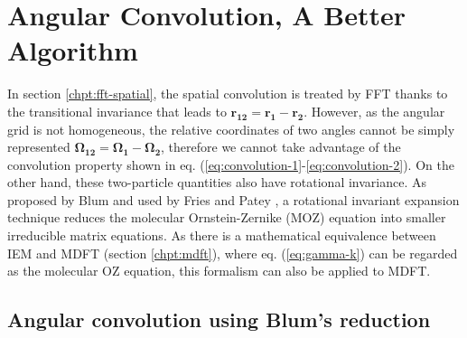 
\chapter{Angular Convolution, A Better Algorithm\label{chpt:angular-convolution}}

In section \ref{chpt:fft-spatial}, the spatial convolution is treated
by FFT thanks to the transitional invariance that leads to $\mathbf{r_{12}}=\mathbf{r_{1}}-\mathbf{r_{2}}$.
However, as the angular grid is not homogeneous, the relative coordinates
of two angles cannot be simply represented $\mathbf{\Omega_{12}}=\mathbf{\Omega_{1}}-\mathbf{\Omega_{2}}$,
therefore we cannot take advantage of the convolution property shown
in eq. (\ref{eq:convolution-1}-\ref{eq:convolution-2}). On the other
hand, these two-particle quantities also have rotational invariance.
As proposed by Blum \citep{Blum_I,Blum_II} and used by Fries and Patey
\citep{Fries_Patey_1985}, a rotational invariant expansion technique
reduces the molecular Ornstein-Zernike (MOZ) equation into smaller
irreducible matrix equations. As there is a mathematical equivalence
between IEM and MDFT (section \ref{chpt:mdft}), where eq. (\ref{eq:gamma-k})
can be regarded as the molecular OZ equation, this formalism can also be
 applied to MDFT.


\section{Angular convolution using Blum's reduction}


